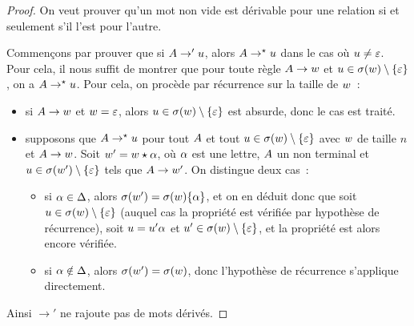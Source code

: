 \begin{proof}
  On veut prouver qu'un mot non vide est dérivable pour une relation si et
  seulement s'il l'est pour l'autre.

  Commençons par prouver que si $A \to' u$, alors
  $A \to^{\mathord{\star}} u$ dans le cas où $u \neq \varepsilon$. Pour cela, il
  nous suffit de montrer que pour toute règle $A \to w$ et
  $u\in\sigma(w)\setminus\{\varepsilon\}$, on a $A\to^{\mathord{\star}}u$.
  Pour cela, on procède par récurrence sur la taille de $w$~:
  \begin{itemize}
  \item si $A \to w$ et $w = \varepsilon$, alors
    $u \in \sigma(w)\setminus\{\varepsilon\}$ est absurde, donc le cas est
    traité.
  \item supposons que $A \to^{\mathord{\star}}u$ pour tout $A$ et tout
    $u \in \sigma(w)\setminus\{\varepsilon\}$ avec $w$ de taille $n$
    et $A\to w$. Soit $w' = w\mathbin{\star} \alpha$, où $\alpha$ est
    une lettre, $A$ un non terminal et
    $u \in \sigma(w')\setminus\{\varepsilon\}$ tels que $A \to w'$.
    On distingue deux cas~:
    \begin{itemize}
    \item si $\alpha \in \Delta$, alors
      $\sigma(w') = \sigma(w)\{\alpha\}$, et on en déduit donc
      que soit $u \in \sigma(w)\setminus\{\varepsilon\}$ (auquel cas la
      propriété est vérifiée par hypothèse de récurrence), soit
      $u=u'\alpha$ et $u'\in\sigma(w)\setminus\{\varepsilon\}$,
      et la propriété est alors encore vérifiée.
    \item si $\alpha \notin \Delta$, alors $\sigma(w')=\sigma(w)$,
      donc l'hypothèse de récurrence s'applique directement.
    \end{itemize}
  \end{itemize}
  Ainsi $\to'$ ne rajoute pas de mots dérivés.


\end{proof}
